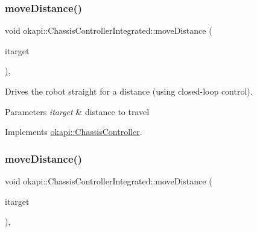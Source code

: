 \subsubsection{\texorpdfstring{moveDistance()}{moveDistance()}\hspace{0.1cm}{\footnotesize\ttfamily [1/2]}}
{\footnotesize\ttfamily void okapi\+::\+Chassis\+Controller\+Integrated\+::move\+Distance (\begin{DoxyParamCaption}\item[{Q\+Length}]{itarget }\end{DoxyParamCaption})\hspace{0.3cm}{\ttfamily [override]}, {\ttfamily [virtual]}}

Drives the robot straight for a distance (using closed-\/loop control).


\begin{DoxyCode}{0}
\DoxyCodeLine{\textcolor{comment}{// Drive forward 6 inches}}
\DoxyCodeLine{}
\DoxyCodeLine{\textcolor{comment}{// Drive backward 0.2 meters}}
\end{DoxyCode}



\begin{DoxyParams}{Parameters}
{\em itarget} & distance to travel \\
\hline
\end{DoxyParams}


Implements \mbox{\hyperlink{classokapi_1_1ChassisController_a6d5b69139dfa8b814d05c74c22bcaa43}{okapi\+::\+Chassis\+Controller}}.

\mbox{\label{classokapi_1_1ChassisControllerIntegrated_ab0361bc7bb5dc0b4ac4c990c1b9dd14f}} 
\subsubsection{\texorpdfstring{moveDistance()}{moveDistance()}\hspace{0.1cm}{\footnotesize\ttfamily [2/2]}}
{\footnotesize\ttfamily void okapi\+::\+Chassis\+Controller\+Integrated\+::move\+Distance (\begin{DoxyParamCaption}\item[{double}]{itarget }\end{DoxyParamCaption})\hspace{0.3cm}{\ttfamily [override]}, {\ttfamily [virtual]}}

